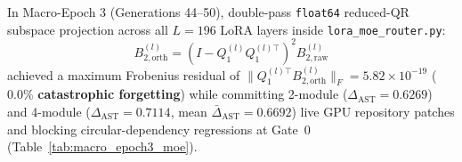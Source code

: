 \documentclass[10pt,twocolumn,letterpaper]{article}
\begin{document}
In Macro-Epoch 3 (Generations 44--50), double-pass \texttt{float64} reduced-QR subspace projection across all $L=196$ LoRA layers inside \texttt{lora\_\allowbreak moe\_\allowbreak router.py}:
\begin{equation}
B_{2,\text{orth}}^{(l)} = \left(I - Q_{1}^{(l)}Q_{1}^{(l)\top}\right)^{2} B_{2,\text{raw}}^{(l)}
\end{equation}
achieved a maximum Frobenius residual of $\|Q_{1}^{(l)\top}B_{2,\text{orth}}^{(l)}\|_{F} = 5.82\times 10^{-19}$ ($\mathbf{0.0\%}$ \textbf{catastrophic forgetting}) while committing 2-module ($\Delta_{\text{AST}}=0.6269$) and 4-module ($\Delta_{\text{AST}}=0.7114$, mean $\bar{\Delta}_{\text{AST}}=0.6692$) live GPU repository patches and blocking circular-dependency regressions at Gate~0 (Table~\ref{tab:macro_epoch3_moe}).

\begin{table}[htbp]
\centering
{}
\caption{Generations 36--43 live CUDA LoRA synthesis and Unbounded RSI verification telemetry (\texttt{live\_gpu\_unbounded\_metrics.json}).}
\label{tab:unbounded_rsi_closure}
\end{table}
\end{document}

